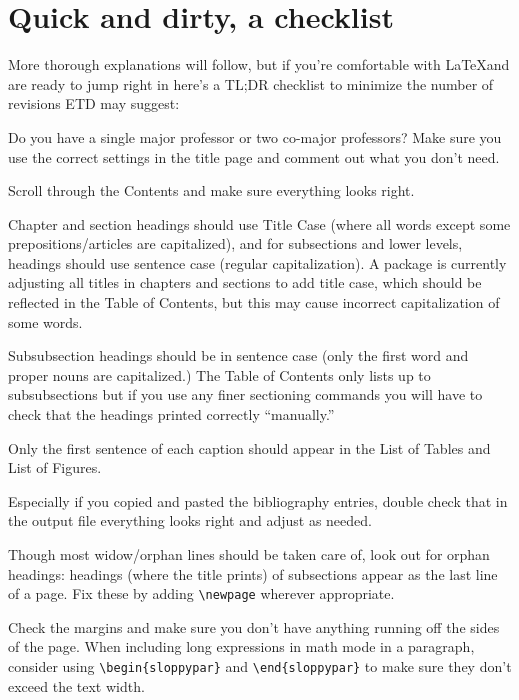 \chapter{Quick and dirty, a checklist}
More thorough explanations will follow, but if you're comfortable with \LaTeX and are ready to jump right in here's a TL;DR checklist to minimize the number of revisions ETD may suggest:

\begin{todolist}
\item Do you have a single major professor or two co-major professors? Make sure you use the correct settings in the title page and comment out what you don't need.
\item Scroll through the Contents and make sure everything looks right. 
\begin{todolist}
\item Chapter and section headings should use Title Case (where all words except some prepositions/articles are capitalized), and for subsections and lower levels, headings should use sentence case (regular capitalization). A package is currently adjusting all titles in chapters and sections to add title case, which should be reflected in the Table of Contents, but this may cause incorrect capitalization of some words.
\item Subsubsection headings should be in sentence case (only the first word and proper nouns are capitalized.) The Table of Contents only lists up to subsubsections but if you use any finer sectioning commands you will have to check that the headings printed correctly ``manually.''
\item Only the first sentence of each caption should appear in the List of Tables and List of Figures.
\end{todolist}
\item Especially if you copied and pasted the bibliography entries, double check that in the output file everything looks right and adjust as needed.
\item Though most widow/orphan lines should be taken care of, look out for orphan headings: headings (where the title prints) of subsections appear as the last line of a page. Fix these by adding \verb|\newpage| wherever appropriate.
\item Check the margins and make sure you don't have anything running off the sides of the page. When including long expressions in math mode in a paragraph, consider using \verb|\begin{sloppypar}| and \verb|\end{sloppypar}| to make sure they don't exceed the text width. 

\end{todolist}
